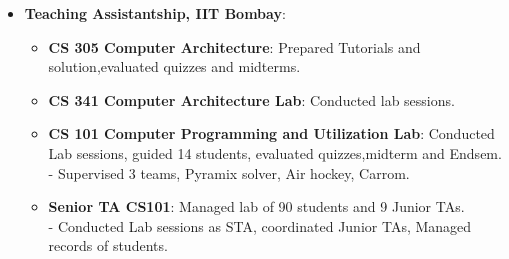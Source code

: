 \begin{itemize}
	\item \textbf{Teaching Assistantship, IIT Bombay}: \hfill \\[-0.6cm]
	\begin{itemize}
		\item \textbf{CS 305 Computer Architecture}: Prepared Tutorials and solution,evaluated quizzes and midterms. 
		\item \textbf{CS 341 Computer Architecture Lab}: Conducted lab sessions. 
		\item \textbf{CS 101 Computer Programming and Utilization Lab}:
Conducted Lab sessions, guided 14 students, evaluated quizzes,midterm and Endsem.
- Supervised 3 teams, Pyramix solver, Air hockey, Carrom.
  \item \textbf{Senior TA CS101}:  
  Managed lab of 90 students and 9 Junior TAs.\\
- Conducted Lab sessions as STA, coordinated Junior TAs, Managed records of students.   
	\end{itemize}
\end{itemize}

